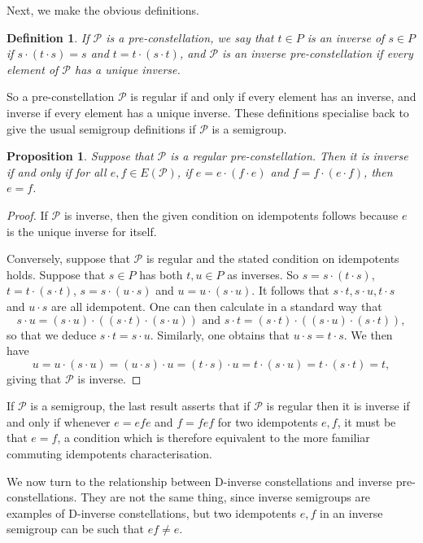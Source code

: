 \documentclass[12pt]{amsart}
\newtheorem{pro}[thm]{Proposition}
\newtheorem{dfn}[thm]{Definition}
\theoremstyle{definition}
\newcommand{\Pcon}{\mathcal P}
\begin{document}
Next, we make the obvious definitions.

\begin{dfn}
If $\Pcon$ is a pre-constellation, we say that $t\in P$ is an {\em inverse} of $s\in P$ if $s\cdot(t\cdot s)=s$ and $t=t\cdot (s\cdot t)$, and $\Pcon$ is an {\em inverse pre-constellation} if every element of $\Pcon$ has a unique inverse.
\end{dfn}

So a pre-constellation $\Pcon$ is regular if and only if every element has an inverse, and inverse if every element has a unique inverse.  These definitions specialise back to give the usual semigroup definitions if $\Pcon$  is a semigroup.    

\begin{pro}  \label{regisinv}
Suppose that $\Pcon$  is a regular pre-constellation.  Then it is inverse if and only if for all $e,f\in E(\Pcon )$, if $e=e\cdot (f\cdot e)$ and $f=f\cdot (e\cdot f)$, then $e=f$.
\end{pro}
\begin{proof}
If $\Pcon$ is inverse, then the given condition on idempotents follows because $e$ is the unique inverse for itself.

Conversely, suppose that $\Pcon$ is regular and the stated condition on idempotents holds.  Suppose that $s\in P$ has both $t,u\in P$ as inverses.  So $s=s\cdot (t\cdot s)$, $t=t\cdot (s\cdot t)$, $s=s\cdot (u\cdot s)$ and $u=u\cdot (s\cdot u)$.  It follows that $s\cdot t, s\cdot u, t\cdot s$ and
$u\cdot s$ are all idempotent. One can then calculate in a standard way that
\[s\cdot u=(s\cdot u)\cdot ((s\cdot t)\cdot (s\cdot u))
\mbox{ and }s\cdot t=(s\cdot t)\cdot ((s\cdot u)\cdot (s\cdot t)),\]
so that we deduce $s\cdot t=s\cdot u$. Similarly, one obtains that
$u\cdot s=t\cdot s$. We then have 
 $$u=u\cdot (s\cdot u)=(u\cdot s)\cdot u=(t\cdot s)\cdot u=t\cdot (s\cdot u)=t\cdot (s\cdot t)=t,$$
giving that $\Pcon $ is inverse.
\end{proof}

If $\Pcon$ is a semigroup, the last result asserts that if $\Pcon$ is regular then it is inverse if and only if whenever $e=efe$ and $f=fef$ for two idempotents $e,f$, it must be that $e=f$,  a condition which is therefore equivalent to the more familiar commuting idempotents characterisation.

We now turn to the relationship between D-inverse constellations and inverse pre-constellations.  They are not the same thing, since inverse semigroups are examples of D-inverse constellations, but two idempotents $e,f$ in an inverse semigroup can be such that $ef\neq e$.  
\end{document}
